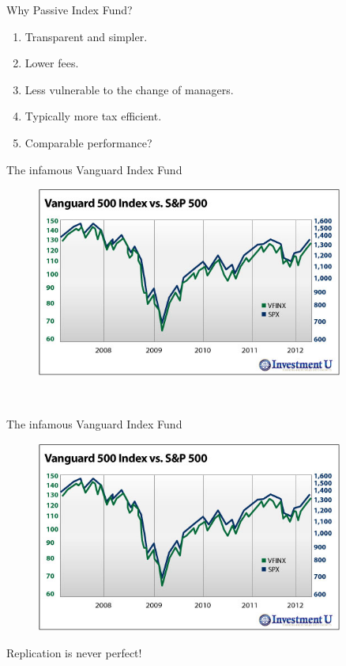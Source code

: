 \documentclass[handout]{beamer}
\begin{document}
\begin{frame}{Why Passive Index Fund?}
   \begin{enumerate}
\item Transparent and simpler.
\item Lower fees.
\item Less vulnerable to the change of managers.
\item Typically more tax efficient.
\item Comparable performance?
\end{enumerate}
\end{frame}

\begin{frame}{The infamous Vanguard Index Fund}
   \begin{figure}
    \centering
    \includegraphics[width = 0.9\textwidth]{figures/vanguard.jpg}
  \end{figure}
   \ 
\end{frame}


\begin{frame}{The infamous Vanguard Index Fund}
   \begin{figure}
    \centering
    \includegraphics[width = 0.9\textwidth]{figures/vanguard.jpg}
  \end{figure}
  Replication is never perfect!
\end{frame}
\end{document}
